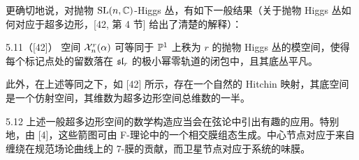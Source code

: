更确切地说，对抛物 $\mathrm{SL}(n,\mathbb{C})$-Higgs 丛，有如下一般结果（关于抛物 Higgs 丛如何对应于超多边形，[42, 第 4 节] 给出了清楚的解释）：

\begin{thm}{5.11（[42]）}
空间 $\mathcal{X}^r_n(\alpha)$ 可等同于 $\mathbb{P}^1$ 上秩为 $r$ 的抛物 Higgs 丛的模空间，使得每个标记点处的留数落在 $\mathfrak{sl}_r$ 的极小幂零轨道的闭包中，且其底丛平凡。
\end{thm}

此外，在上述等同之下，如 [42] 所示，存在一个自然的 Hitchin 映射，其底空间是一个仿射空间，其维数为超多边形空间总维数的一半。

\begin{rem}{5.12}
上述一般超多边形空间的数学构造应当会在弦论中引出有趣的应用。特别地，由 [4]，这些箭图可由 F-理论中的一个相交膜组态生成。中心节点对应于来自缠绕在规范场论曲线上的 7-膜的贡献，而卫星节点对应于系统的味膜。
\end{rem}

